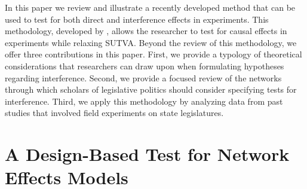\documentclass[12pt]{article}
\begin{document}
In this paper we review and illustrate a recently developed method that can be used to test for both direct and interference effects in experiments. This methodology, developed by \citet{bowers2012reasoning}, allows the researcher to test for causal effects in experiments while relaxing SUTVA. Beyond the review of this methodology, we offer three contributions in this paper. First, we provide a typology of theoretical considerations that researchers can draw upon when formulating hypotheses regarding interference. Second, we provide a focused review of the networks through which scholars of legislative politics should consider specifying tests for interference. Third, we apply this methodology by analyzing data from past studies that involved field experiments on state legislatures. 






\section{A Design-Based Test for Network Effects Models}
\end{document}
